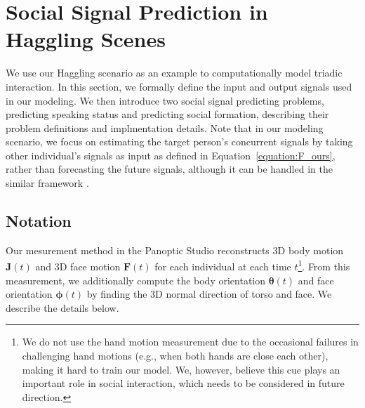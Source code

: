 
\section{Social Signal Prediction in Haggling Scenes}
We use our Haggling scenario as an example to computationally model triadic interaction.  In this section, we formally define the input and output signals used in our modeling. We then introduce two social signal predicting problems, predicting speaking status and predicting social formation, describing their problem definitions and implmentation details. Note that in our modeling scenario, we focus on estimating the target person's concurrent signals by taking other individual's signals as input  as defined in Equation~\ref{equation:F_ours}, rather than forecasting the future signals, although it can be handled in the similar framework .  

\subsection{Notation}

Our mesurement method in the Panoptic Studio reconstructs 3D body motion $\mathbf{J}(t)$ and 3D face motion $\mathbf{F}(t)$ for each individual at each time $t$\footnote{We do not use the hand motion measurement due to the occasional failures in challenging hand motions (e.g., when both hands are close each other), making it hard to train our model. We, however, believe this cue plays an important role in social interaction, which needs to be considered in future direction.}. From this measurement, we additionally compute the body orientation $\boldsymbol{\theta}(t)$ and face orientation $\boldsymbol{\phi}(t)$ by finding the 3D normal direction of torso and face. We describe the details below.

